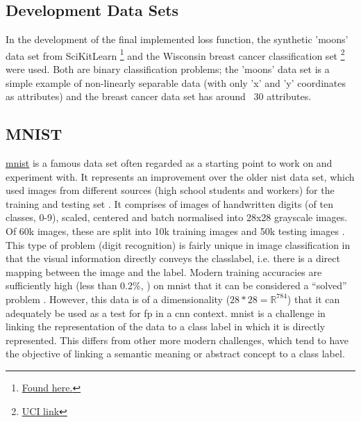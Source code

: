 \subsection{Development Data Sets}

In the development of the final implemented loss function, the synthetic 'moons' data set from SciKitLearn \footnote{\href{https://scikit-learn.org/stable/modules/generated/sklearn.datasets.make_moons.html}{Found here.}} and the Wisconsin breast cancer classification set \cite{uci_ml_data} \footnote{\href{https://archive.ics.uci.edu/ml/datasets/Breast+Cancer+Wisconsin+(Diagnostic)}{UCI link}} were used. Both are binary classification problems; the 'moons' data set is a simple example of non-linearly separable data (with only 'x' and 'y' coordinates as attributes) and the breast cancer data set has around ~30 attributes.

\subsection{MNIST}
 
\href{http://yann.lecun.com/exdb/mnist/}{\gls{mnist}} is a famous data set often regarded as a starting point to work on and experiment with. It represents an improvement over the older \gls{nist} data set, which used images from different sources (high school students and workers) for the training and testing set \cite{nist}. It comprises of images of handwritten digits (of ten classes, 0-9), scaled, centered and batch normalised into 28x28 grayscale images. Of 60k images, these are split into 10k training images and 50k testing images \cite{mnist}. This type of problem (digit recognition) is fairly unique in image classification in that the visual information directly conveys the \gls{classlabel}, i.e. there is a direct mapping between the image and the label. Modern training accuracies are sufficiently high (less than 0.2\%, \cite{mnist_sota}) on \gls{mnist} that it can be considered a \enquote{solved} problem \cite{mnist_sota_web}. However, this data is of a dimensionality ($28 * 28 = \mathds{R}^{784}$) that it can adequately be used as a test for \gls{fp} in a \gls{cnn} context. \Gls{mnist} is a challenge in linking the representation of the data to a class label in which it is directly represented. This differs from other more modern challenges, which tend to have the objective of linking a semantic meaning or abstract concept to a class label. 
\bigskip


%

